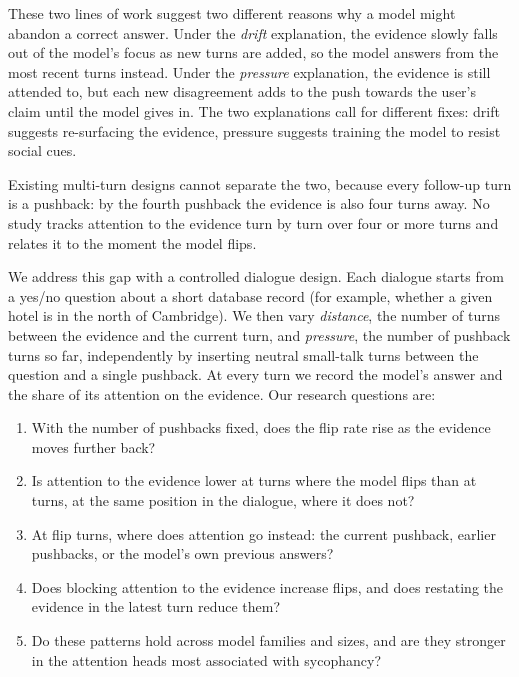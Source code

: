 \documentclass[sigconf,nonacm]{acmart}
\begin{document}
These two lines of work suggest two different reasons why a model might abandon a correct answer. Under
the \emph{drift} explanation, the evidence slowly falls out of the model's focus as new turns are added,
so the model answers from the most recent turns instead. Under the \emph{pressure} explanation, the
evidence is still attended to, but each new disagreement adds to the push towards the user's claim until
the model gives in. The two explanations call for different fixes: drift suggests re-surfacing the
evidence, pressure suggests training the model to resist social cues.

Existing multi-turn designs cannot separate the two, because every follow-up turn is a pushback: by the
fourth pushback the evidence is also four turns away. No study tracks attention to the evidence turn by
turn over four or more turns and relates it to the moment the model flips.

We address this gap with a controlled dialogue design. Each dialogue starts from a yes/no question about
a short database record (for example, whether a given hotel is in the north of Cambridge). We then vary
\emph{distance}, the number of turns between the evidence and the current turn, and \emph{pressure}, the
number of pushback turns so far, independently by inserting neutral small-talk turns between the
question and a single pushback. At every turn we record the model's answer and the share of its
attention on the evidence. Our research questions are:

\begin{enumerate}[leftmargin=*,label=\textbf{RQ\arabic*}]
  \item With the number of pushbacks fixed, does the flip rate rise as the evidence moves further back?
  \item Is attention to the evidence lower at turns where the model flips than at turns, at the same
        position in the dialogue, where it does not?
  \item At flip turns, where does attention go instead: the current pushback, earlier pushbacks, or the
        model's own previous answers?
  \item Does blocking attention to the evidence increase flips, and does restating the evidence in the
        latest turn reduce them?
  \item Do these patterns hold across model families and sizes, and are they stronger in the attention
        heads most associated with sycophancy?
\end{enumerate}
\end{document}
